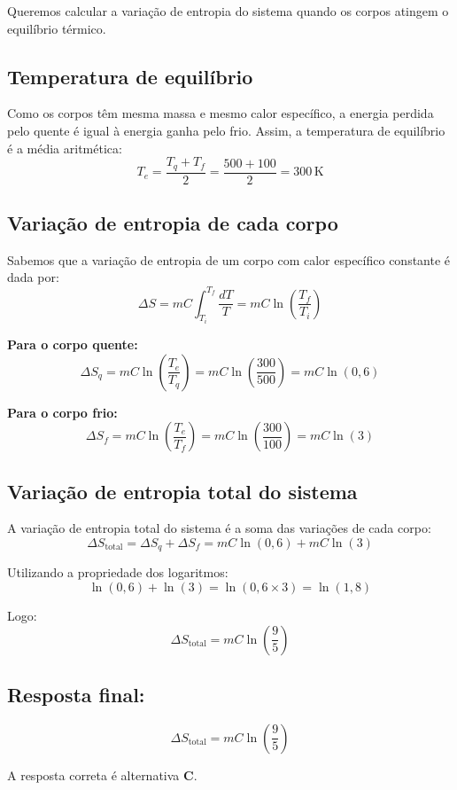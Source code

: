 \documentclass[a4paper,12pt]{article}
\begin{document}
\begin{flushleft}
Queremos calcular a variação de entropia do sistema quando os corpos atingem o equilíbrio térmico.

\subsection*{Temperatura de equilíbrio}

Como os corpos têm mesma massa e mesmo calor específico, a energia perdida pelo quente é igual à energia ganha pelo frio. Assim, a temperatura de equilíbrio é a média aritmética:
\[
T_e = \frac{T_q + T_f}{2} = \frac{500 + 100}{2} = 300\,\mathrm{K}
\]

\subsection*{Variação de entropia de cada corpo}

Sabemos que a variação de entropia de um corpo com calor específico constante é dada por:
\[
\Delta S = mC \int_{T_i}^{T_f} \frac{dT}{T} = mC \ln\left( \frac{T_f}{T_i} \right)
\]

\textbf{Para o corpo quente:}
\[
\Delta S_q =
mC \ln\left( \frac{T_e}{T_q} \right) =
mC \ln\left( \frac{300}{500} \right) =
mC \ln(0{,}6)
\]

\textbf{Para o corpo frio:}
\[
\Delta S_f =
mC \ln\left( \frac{T_e}{T_f} \right) =
mC \ln\left( \frac{300}{100} \right) =
mC \ln(3)
\]

\subsection*{Variação de entropia total do sistema}

A variação de entropia total do sistema é a soma das variações de cada corpo:
\[
\Delta S_\text{total} =
\Delta S_q + \Delta S_f =
mC \ln(0{,}6) + mC \ln(3)
\]

Utilizando a propriedade dos logaritmos:
\[
\ln(0{,}6) + \ln(3) = \ln(0{,}6 \times 3) = \ln(1{,}8)
\]

Logo:
\[
\Delta S_\text{total} =
mC \ln(\frac{9}{5})
\]

\subsection*{Resposta final:}
\[
\boxed{
\Delta S_\text{total} =
mC \ln(\frac{9}{5})
}
\]



A resposta correta é alternativa \colorbox{green!50}{\textbf{C}}.
\end{flushleft}
\end{document}
